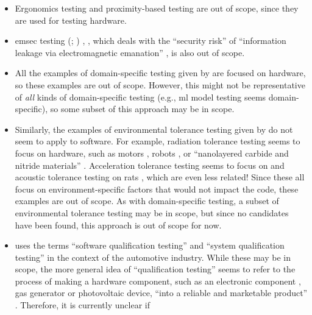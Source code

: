 \begin{itemize}
    \item Ergonomics testing and proximity-based testing \citepISTQB{}
          are out of scope, since they are used for testing hardware.
    \item \acf{emsec} testing \ifnotpaper
              (\citealp{ISO2021}; \citealp[p.~95]{ZhouEtAl2012})\else
              \cite{ISO2021}, \cite[p.~95]{ZhouEtAl2012}\fi, which deals with
          the ``security risk'' of ``information leakage via electromagnetic
          emanation'' \citep[p.~95]{ZhouEtAl2012}, is also out of scope.
          \ifnotpaper
    \item All the examples of domain-specific testing given by
          \citet[p.~26]{Firesmith2015} are focused on hardware, so these
          examples are out of scope. However, this might not be representative
          of \emph{all} kinds of domain-specific testing (e.g., \acf{ml} model
          testing seems domain-specific), so some subset of this approach may
          be in scope.
    \item Similarly, the examples of environmental tolerance testing given by
          \citet[p.~56]{Firesmith2015} do not seem to apply to software.
          For example, radiation tolerance testing seems to focus on hardware,
          such as motors \citep{MukhinEtAl2022}, robots \citep{ZhangEtAl2020},
          or ``nanolayered carbide and nitride materials''
          \citep[p.~1]{TunesEtAl2022}. Acceleration tolerance testing seems to
          focus on \accelTolTest{} and acoustic tolerance testing on rats
          \citep{HolleyEtAl1996}, which are even less related! Since these all
          focus on environment-specific factors that would not impact the code,
          these examples are out of scope. As with domain-specific testing, a
          subset of environmental tolerance testing may be in scope, but since
          no candidates have been found, this approach is out of scope for now.
    \item \citet{SPICE2022} uses the terms ``software
          qualification testing'' and ``system qualification testing'' in the
          context of the automotive industry. While these may be in scope, the
          more general idea of ``qualification testing'' seems to refer to the
          process of making a hardware component, such as an electronic
          component \citep{AhsanEtAl2020}, gas generator \citep{ParateEtAl2021}
          or photovoltaic device, ``into a reliable and marketable product''
          \citep[p.~1]{SuhirEtAl2013}. Therefore, it is currently unclear if

\end{itemize}
